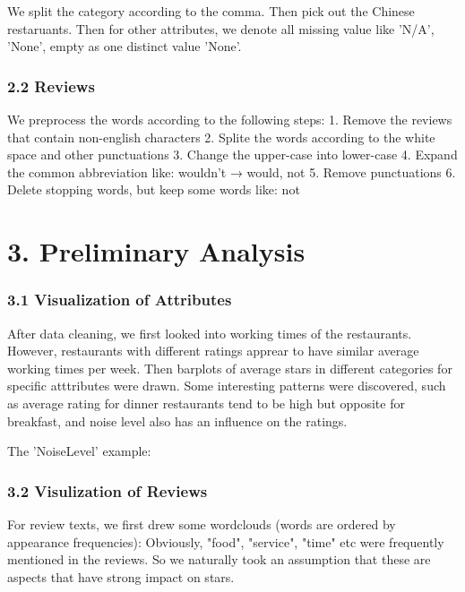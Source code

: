 \documentclass[11pt]{article}
\begin{document}
    We split the category according to the comma. Then pick out the Chinese
restaruants. Then for other attributes, we denote all missing value like
'N/A', 'None', empty as one distinct value 'None'.

    \subsubsection{2.2 Reviews}\label{reviews}

    We preprocess the words according to the following steps: 1. Remove the
reviews that contain non-english characters 2. Splite the words
according to the white space and other punctuations 3. Change the
upper-case into lower-case 4. Expand the common abbreviation like:
wouldn't → would, not 5. Remove punctuations 6. Delete stopping words,
but keep some words like: not

    \section{3. Preliminary Analysis}\label{preliminary-analysis}

    \subsubsection{3.1 Visualization of
Attributes}\label{visualization-of-attributes}

    After data cleaning, we first looked into working times of the
restaurants. However, restaurants with different ratings apprear to have
similar average working times per week. Then barplots of average stars
in different categories for specific atttributes were drawn. Some
interesting patterns were discovered, such as average rating for dinner
restaurants tend to be high but opposite for breakfast, and noise level
also has an influence on the ratings.

The 'NoiseLevel' example: 

    \subsubsection{3.2 Visulization of
Reviews}\label{visulization-of-reviews}

    For review texts, we first drew some wordclouds (words are ordered by
appearance frequencies): Obviously, "food", "service", "time" etc were
frequently mentioned in the reviews. So we naturally took an assumption
that these are aspects that have strong impact on stars.
\end{document}
